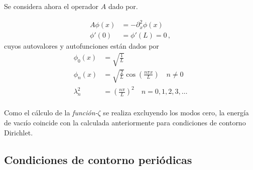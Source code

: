 Se considera ahora el operador $A$ dado por.

\begin{equation}
\begin{aligned}
	A \phi (x) &= - \partial _x ^2 \phi (x) \\[10pt]
    \phi ' (0) &= \phi ' (L) = 0 \, ,
\end{aligned}
\end{equation}
cuyos autovalores y autofunciones están dados por
\begin{equation}
\begin{aligned}
	\phi _0 (x) &= \sqrt{ \frac{1}{L} } \\[5pt]
	\phi _n (x)  &= \sqrt{\frac{2}{L}} \cos \left( \frac{n \pi x}{L} \right) 
	\, \, \, \, \, \, n \neq 0\\[5pt]
	\lambda ^2 _n  &= \left( \frac{n \pi }{L} \right) ^2 
	\, \, \, \, \, \,
	n = 0,1,2,3, \dots
	\\[5pt]
\end{aligned}
\end{equation}


Como el cálculo de la {\it función-$\zeta$} se realiza excluyendo los modos cero, la
energía de vacıío coincide con la calculada anteriormente para condiciones
de contorno Dirichlet.\\


\subsection*{Condiciones de contorno periódicas}


